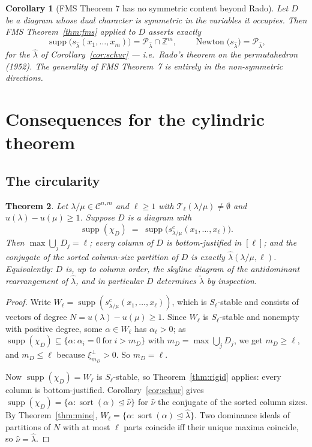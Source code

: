 \documentclass[11pt]{article}
\newtheorem{thm}{Theorem}[section]
\newtheorem{cor}[thm]{Corollary}
\theoremstyle{definition}
\DeclareMathOperator{\supp}{supp}
\DeclareMathOperator{\Newton}{Newton}
\DeclareMathOperator{\sort}{sort}
\newcommand{\Z}{\mathbb{Z}}
\newcommand{\cyl}{\mathcal{C}}
\begin{document}
\begin{cor}[FMS Theorem 7 has no symmetric content beyond Rado]\label{cor:rado}
Let $D$ be a diagram whose dual character is symmetric in the variables it occupies. Then FMS
Theorem~\ref{thm:fms} applied to $D$ asserts exactly
\[
  \supp\bigl(s_{\hat\lambda}(x_1,\dots,x_m)\bigr)=\mathcal{P}_{\hat\lambda}\cap\Z^m,
  \qquad
  \Newton\bigl(s_{\hat\lambda}\bigr)=\mathcal{P}_{\hat\lambda},
\]
for the $\hat\lambda$ of Corollary~\ref{cor:schur} --- i.e.\ Rado's theorem on the
permutahedron (1952). The generality of FMS Theorem~7 is entirely in the non-symmetric
directions.
\end{cor}

\section{Consequences for the cylindric theorem}

\subsection{The circularity}

\begin{thm}\label{thm:circular}
Let $\lambda/\mu\in\cyl^{n,m}$ and $\ell\ge1$ with $\mathcal{T}_\ell(\lambda/\mu)\ne\emptyset$
and $u(\lambda)-u(\mu)\ge1$. Suppose $D$ is a diagram with
\[
  \supp(\chi_D)\;=\;\supp\bigl(s^c_{\lambda/\mu}(x_1,\dots,x_\ell)\bigr).
\]
Then $\max\bigcup_jD_j=\ell$; every column of $D$ is bottom-justified in $[\ell]$; and the
conjugate of the sorted column-size partition of $D$ is exactly $\hat\lambda(\lambda/\mu,\ell)$.
Equivalently: $D$ is, up to column order, the skyline diagram of the antidominant rearrangement
of $\hat\lambda$, and in particular $D$ determines $\hat\lambda$ by inspection.
\end{thm}

\begin{proof}
Write $W_\ell=\supp(s^c_{\lambda/\mu}(x_1,\dots,x_\ell))$, which is $S_\ell$-stable and consists
of vectors of degree $N=u(\lambda)-u(\mu)\ge1$. Since $W_\ell$ is $S_\ell$-stable and nonempty
with positive degree, some $\alpha\in W_\ell$ has $\alpha_\ell>0$; as
$\supp(\chi_D)\subseteq\{\alpha:\alpha_i=0\ \text{for}\ i>m_D\}$ with $m_D=\max\bigcup_jD_j$,
we get $m_D\ge\ell$, and $m_D\le\ell$ because $\xi^{\perp}_{m_D}>0$. So $m_D=\ell$.

Now $\supp(\chi_D)=W_\ell$ is $S_\ell$-stable, so Theorem~\ref{thm:rigid} applies: every column
is bottom-justified. Corollary~\ref{cor:schur} gives
$\supp(\chi_D)=\{\alpha:\sort(\alpha)\trianglelefteq\hat\nu\}$ for $\hat\nu$ the conjugate of
the sorted column sizes. By Theorem~\ref{thm:mine},
$W_\ell=\{\alpha:\sort(\alpha)\trianglelefteq\hat\lambda\}$. Two dominance ideals of partitions
of $N$ with at most $\ell$ parts coincide iff their unique maxima coincide, so
$\hat\nu=\hat\lambda$.
\end{proof}
\end{document}
